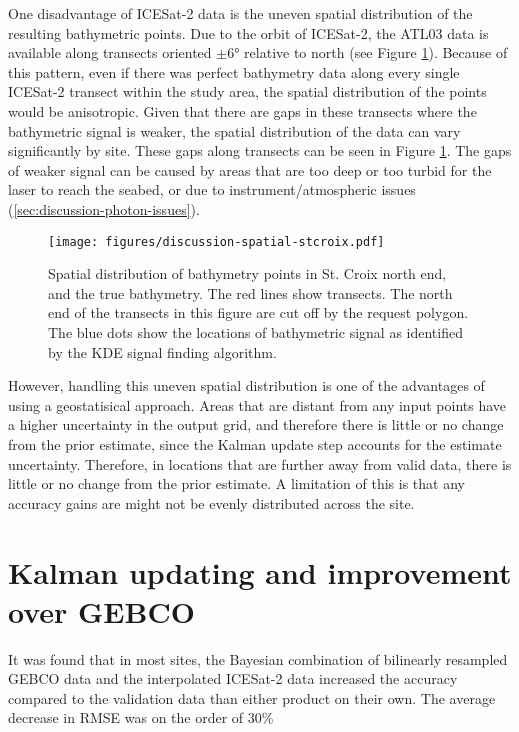 One disadvantage of ICESat-2 data is the uneven spatial distribution of the resulting bathymetric points. Due to the orbit of ICESat-2, the ATL03 data is available along transects oriented $\pm \ang{6}$ relative to north (see Figure \ref{fig:distribution-of-bathy-points-in-space}). Because of this pattern, even if there was perfect bathymetry data along every single ICESat-2 transect within the study area, the spatial distribution of the points would be anisotropic. Given that there are gaps in these transects where the bathymetric signal is weaker, the spatial distribution of the data can vary significantly by site. These gaps along transects can be seen in Figure \ref{fig:distribution-of-bathy-points-in-space}. The gaps of weaker signal can be caused by areas that are too deep or too turbid for the laser to reach the seabed, or due to instrument/atmospheric issues (\ref{sec:discussion-photon-issues}). 


\begin{figure}
    \centering
    \texttt{[image: figures/discussion-spatial-stcroix.pdf]}
    \caption{Spatial distribution of bathymetry points in St. Croix north end, and the true bathymetry. The red lines show transects. The north end of the transects in this figure are cut off by the request polygon. The blue dots show the locations of bathymetric signal as identified by the KDE signal finding algorithm.}
    \label{fig:distribution-of-bathy-points-in-space}
\end{figure}

However, handling this uneven spatial distribution is one of the advantages of using a geostatisical approach. Areas that are distant from any input points have a higher uncertainty in the output grid, and therefore there is little or no change from the prior estimate, since the Kalman update step accounts for the estimate uncertainty. Therefore, in locations that are further away from valid data, there is little or no change from the prior estimate. A limitation of this is that any accuracy gains are might not be evenly distributed across the site. 

\section{Kalman updating and improvement over GEBCO}

It was found that in most sites, the Bayesian combination of bilinearly resampled GEBCO data and the interpolated ICESat-2 data increased the accuracy compared to the validation data than either product on their own. The average decrease in RMSE was on the order of 30\% 


